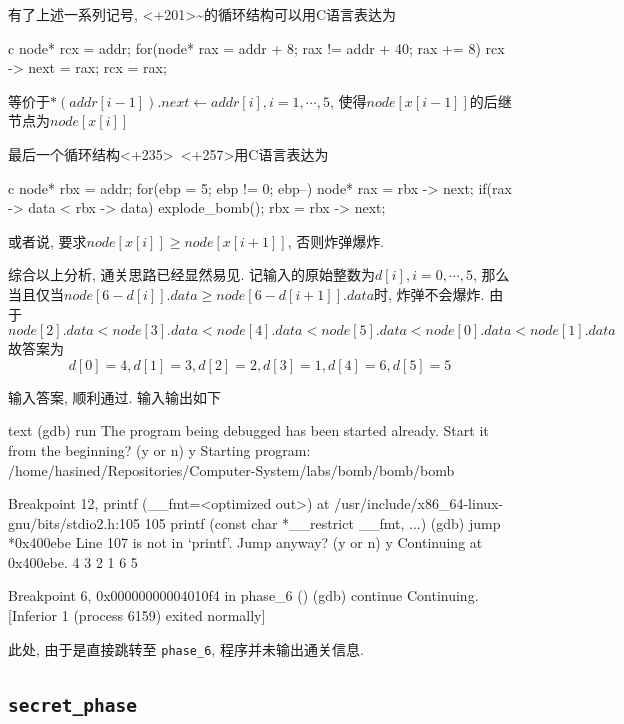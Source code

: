 有了上述一系列记号, <+201>\textasciitilde<+235>的循环结构可以用C语言表达为
\begin{code}{c}
node* rcx = addr;
for(node* rax = addr + 8; rax != addr + 40; rax += 8) {
    rcx -> next = rax;
    rcx = rax;
}
\end{code}
等价于$*(addr[i-1]).next \leftarrow addr[i], i=1,\cdots,5$, 使得$node[x[i-1]]$的后继节点为$node[x[i]]$

最后一个循环结构<+235>~<+257>用C语言表达为
\begin{code}{c}
node* rbx = addr;
for(ebp = 5; ebp != 0; ebp--) {
    node* rax = rbx -> next;
    if(rax -> data < rbx -> data)
        explode_bomb();
    rbx = rbx -> next;
}
\end{code}
或者说, 要求$node[x[i]] \geq node[x[i+1]]$, 否则炸弹爆炸. 

综合以上分析, 通关思路已经显然易见. 记输入的原始整数为$d[i], i=0,\cdots,5$, 那么当且仅当$node[6-d[i]].data \geq node[6-d[i+1]].data$时, 炸弹不会爆炸. 由于
$$ node[2].data < node[3].data < node[4].data < node[5].data < node[0].data < node[1].data$$
故答案为
$$d[0]=4,d[1]=3,d[2]=2,d[3]=1,d[4]=6,d[5]=5$$

输入答案, 顺利通过. 输入输出如下
\begin{code}{text}
(gdb) run
The program being debugged has been started already.
Start it from the beginning? (y or n) y
Starting program: /home/hasined/Repositories/Computer-System/labs/bomb/bomb/bomb

Breakpoint 12, printf (__fmt=<optimized out>) at /usr/include/x86_64-linux-gnu/bits/stdio2.h:105
105     printf (const char *__restrict __fmt, ...)
(gdb) jump *0x400ebe
Line 107 is not in `printf'.  Jump anyway? (y or n) y
Continuing at 0x400ebe.
4 3 2 1 6 5

Breakpoint 6, 0x00000000004010f4 in phase_6 ()
(gdb) continue
Continuing.
[Inferior 1 (process 6159) exited normally]
\end{code}

此处, 由于是直接跳转至 \verb|phase_6|, 程序并未输出通关信息.

\subsection{\texttt{secret_phase}}

